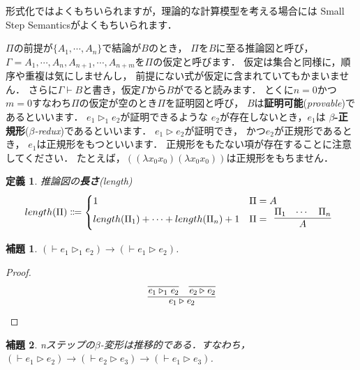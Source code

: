 \documentclass{ltjsbook}%
\newtheorem{lemma}{補題}[section]%
\newtheorem{definition}{定義}[section]%
\newcommand\term[2]{\textbf{#1}{(\textit{#2})}}%
\begin{document}
形式化ではよくもちいられますが，理論的な計算模型を考える場合には%
Small Step Semanticsがよくもちいられます．%
\par$\Pi$の前提が$\{A_1,\cdots,A_n\}$で結論が$B$のとき，%
$\Pi$を$B$に至る推論図と呼び，%
$\Gamma=A_1,\cdots,A_n,A_{n+1},\cdots,A_{n+m}$を$\Pi$の仮定と呼びます．%
仮定は集合と同様に，順序や重複は気にしませんし，%
前提にない式が仮定に含まれていてもかまいません．%
さらに$\Gamma\vdash B$と書き，仮定$\Gamma$から$B$がでると読みます．%
とくに$n=0$かつ$m=0$すなわち$\Pi$の仮定が空のとき$\Pi$を証明図と呼び，%
$B$は\term{証明可能}{provable}であるといいます．%
$\mathit{e}_1\triangleright_1\mathit{e}_2$が証明できるような%
$\mathit{e}_2$が存在しないとき，$\mathit{e}_1$は%
\term{$\beta$-正規形}{$\beta$-redux}であるといいます．%
$\mathit{e}_1\triangleright\mathit{e}_2$が証明でき，%
かつ$\mathit{e}_2$が正規形であるとき，%
$\mathit{e}_1$は正規形をもつといいます．%
正規形をもたない項が存在することに注意してください．%
たとえば，$((\lambda x_0x_0)(\lambda x_0x_0))$は正規形をもちません．%
\begin{definition}%
推論図の\term{長さ}{length}%
\begin{equation}%
  length(\Pi)\Coloneqq\begin{cases}%
  1&\Pi=A\\%
  length(\Pi_1)+\cdots+length(\Pi_n)+1%
  &\Pi=\begin{array}{c}\infer{A}{\Pi_1&\cdots&\Pi_n}\end{array}%
  \end{cases}%
\end{equation}%
\end{definition}%
\begin{lemma}%
  \label{lemma:beta_reduct1n}%
  $(\vdash\mathit{e}_1\triangleright_1\mathit{e}_2)\rightarrow%
  (\vdash\mathit{e}_1\triangleright\mathit{e}_2)$.%
\end{lemma}%
\begin{proof}%
  \begin{equation}%
    \infer{%
      \mathit{e}_1\triangleright\mathit{e}_2%
    }{%
      \infer{\mathit{e}_1\triangleright_1\mathit{e}_2}{}%
    &%
      \infer{\mathit{e}_2\triangleright\mathit{e}_2}{}%
    }%
  \end{equation}%
\end{proof}%
\begin{lemma}%
  \label{lemma:beta_reduct_trans}%
  nステップの$\beta$-変形は推移的である．すなわち，%
  $(\vdash\mathit{e}_1\triangleright\mathit{e}_2)\rightarrow%
  (\vdash\mathit{e}_2\triangleright\mathit{e}_3)\rightarrow%
  (\vdash\mathit{e}_1\triangleright\mathit{e}_3)$.%
\end{lemma}%
\end{document}
